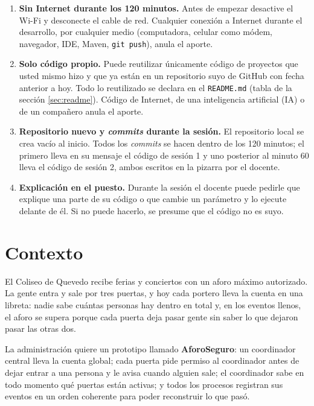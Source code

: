 \documentclass[11pt,a4paper]{article}
\begin{document}
\begin{pisoBox}[title={Reglas de la sesión (su incumplimiento implica calificación CERO)}]
	\begin{enumerate}[label=\textbf{R\arabic*.},leftmargin=2.2em]
		\item \textbf{Sin Internet durante los 120 minutos.} Antes de empezar desactive el Wi-Fi y desconecte el cable de red. Cualquier conexión a Internet durante el desarrollo, por cualquier medio (computadora, celular como módem, navegador, IDE, Maven, \texttt{git push}), anula el aporte.
		\item \textbf{Solo código propio.} Puede reutilizar únicamente código de proyectos que usted mismo hizo y que ya están en un repositorio suyo de GitHub con fecha anterior a hoy. Todo lo reutilizado se declara en el \texttt{README.md} (tabla de la sección \ref{sec:readme}). Código de Internet, de una inteligencia artificial (IA) o de un compañero anula el aporte.
		\item \textbf{Repositorio nuevo y \emph{commits} durante la sesión.} El repositorio local se crea vacío al inicio. Todos los \emph{commits} se hacen dentro de los 120 minutos; el primero lleva en su mensaje el código de sesión 1 y uno posterior al minuto 60 lleva el código de sesión 2, ambos escritos en la pizarra por el docente.
		\item \textbf{Explicación en el puesto.} Durante la sesión el docente puede pedirle que explique una parte de su código o que cambie un parámetro y lo ejecute delante de él. Si no puede hacerlo, se presume que el código no es suyo.
	\end{enumerate}
\end{pisoBox}

\section{Contexto}

El Coliseo de Quevedo recibe ferias y conciertos con un aforo máximo autorizado. La gente entra y sale por tres puertas, y hoy cada portero lleva la cuenta en una libreta: nadie sabe cuántas personas hay dentro en total y, en los eventos llenos, el aforo se supera porque cada puerta deja pasar gente sin saber lo que dejaron pasar las otras dos.

La administración quiere un prototipo llamado \textbf{AforoSeguro}: un coordinador central lleva la cuenta global; cada puerta pide permiso al coordinador antes de dejar entrar a una persona y le avisa cuando alguien sale; el coordinador sabe en todo momento qué puertas están activas; y todos los procesos registran sus eventos en un orden coherente para poder reconstruir lo que pasó.
\end{document}
